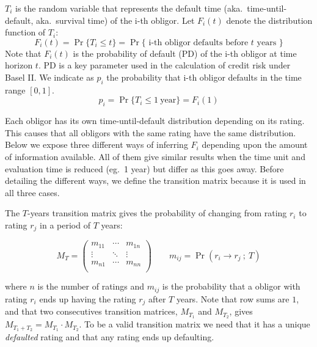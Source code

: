 \documentclass[11pt,fleqn]{book} %
\begin{document}
\begin{definition}
	$T_i$ is the random variable that represents the default time 
	(aka.\ time-until-default, aka.\ survival time) of the i-th obligor. 
	Let $F_i(t)$ denote the distribution function of $T_i$:
	\begin{displaymath}
		F_i(t) = \Pr\{T_i \le t\} = 
		\Pr\{\text{ i-th obligor defaults before $t$ years }\}
	\end{displaymath}
	Note that $F_i(t)$ is the probability of default (PD) of the i-th obligor
	at time horizon $t$. PD is a key parameter used in the calculation of credit 
	risk under Basel II\@. We indicate as $p_i$ the probability that i-th obligor 
	defaults in the time range $[0,1]$.
	\begin{displaymath}
		p_i = \Pr\{T_i \le 1\ \text{year}\} = F_i(1) 
	\end{displaymath}
\end{definition}

Each obligor has its own time-until-default distribution depending on its 
rating. This causes that all obligors with the same rating have the same 
distribution. Below we expose three different ways of inferring $F_i$ 
depending upon the amount of information available. All of them give similar 
results when the time unit and evaluation time is reduced (eg.\ 1 year) but 
differ as this goes away. Before detailing the different ways, we define the 
transition matrix because it is used in all three cases.

\begin{definition}
	\label{def:tm}
	The $T$-years transition matrix gives the probability of changing 
	from rating $r_i$ to rating $r_j$ in a period of $T$ years:
	{\small
	\begin{displaymath}
		M_T = \left(
		\begin{array}{ccc}
			m_{11} & \cdots & m_{1n} \\
			\vdots & \ddots & \vdots \\
			m_{n1} & \cdots & m_{nn} \\
		\end{array}
		\right)
		\qquad
		m_{ij} = \Pr(r_i \to r_j\ ;\ T)
	\end{displaymath}\par}
	where $n$ is the number of ratings and $m_{ij}$ is the probability that a
	obligor with rating $r_i$ ends up having the rating $r_j$ after $T$ years.
	Note that row sums are $1$, and that two consecutives transition matrices, 
	$M_{T_1}$ and $M_{T_2}$, gives $M_{T_1+T_2} = M_{T_1} \cdot M_{T_2}$.
	To be a valid transition matrix we need that it has a unique \emph{defaulted}
	rating and that any rating ends up defaulting.
\end{definition}
\end{document}
